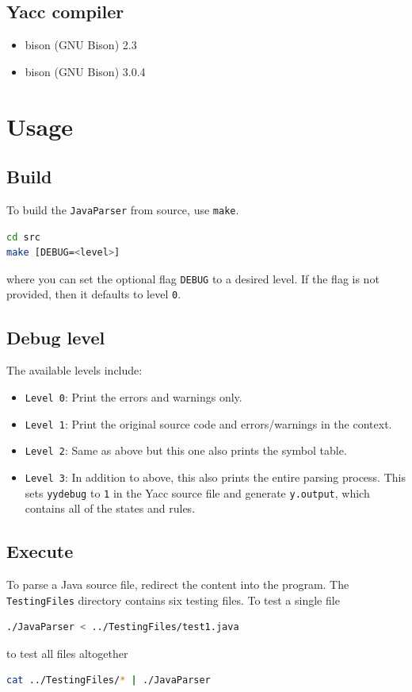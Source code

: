 \documentclass[12pt]{article}
\begin{document}
\subsection{Yacc compiler}
\begin{itemize}
    \item bison (GNU Bison) 2.3
    \item bison (GNU Bison) 3.0.4
\end{itemize}

\section{Usage}
\subsection{Build}
To build the \texttt{JavaParser} from source, use \texttt{make}.

\begin{lstlisting}[language=sh]
cd src
make [DEBUG=<level>]
\end{lstlisting}

where you can set the optional flag \texttt{DEBUG} to a desired level. If the flag is not provided, then it defaults to level \texttt{0}.
\subsection{Debug level}
The available levels include:

\begin{itemize}
    \item \texttt{Level 0}: Print the errors and warnings only.
    \item \texttt{Level 1}: Print the original source code and errors/warnings in the context.
    \item \texttt{Level 2}: Same as above but this one also prints the symbol table.
    \item \texttt{Level 3}: In addition to above, this also prints the entire parsing process. This sets \texttt{yydebug} to \texttt{1} in the Yacc source file and generate \texttt{y.output}, which contains all of the states and rules.
\end{itemize}

\subsection{Execute}
To parse a Java source file, redirect the content into the program. The \texttt{TestingFiles} directory contains six testing files. To test a single file
\begin{lstlisting}[language=sh]
./JavaParser < ../TestingFiles/test1.java
\end{lstlisting}
to test all files altogether
\begin{lstlisting}[language=sh]
cat ../TestingFiles/* | ./JavaParser
\end{lstlisting}
\end{document}
